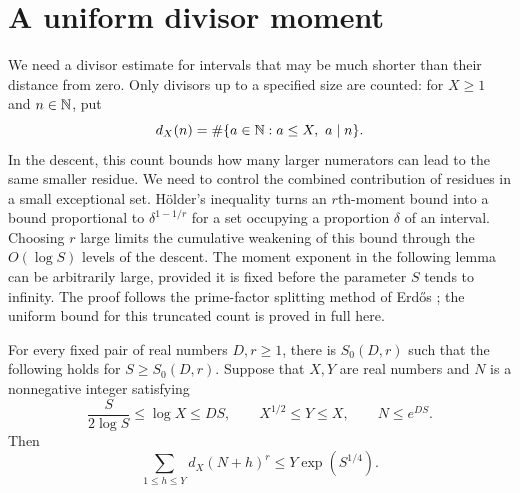 \section{A uniform divisor moment}\label{sec:divisors}

We need a divisor estimate for intervals that may be much shorter than
their distance from zero. Only divisors up to a specified size are counted:
for \(X\ge1\) and \(n\in\mathbb N\), put
\[
 d_X(n)=\#\{a\in\mathbb N:a\le X,\ a\mid n\}.
\]
In the descent, this count bounds how many larger numerators can
lead to the same smaller residue. We need to control the combined
contribution of residues in a small exceptional set. H\"older's inequality
turns an \(r\)th-moment bound into a bound proportional to
\(\delta^{1-1/r}\) for a set occupying a proportion \(\delta\) of
an interval. Choosing \(r\) large limits the cumulative weakening of
this bound through the \(O(\log S)\) levels of the descent.
The moment exponent in the following lemma can be arbitrarily large,
provided it is fixed before the parameter \(S\) tends to infinity.
The proof follows the prime-factor splitting method of
Erd\H{o}s \cite[Section~3]{Erdos1952Divisors}; the uniform bound
for this truncated count is proved in full here.

\begin{lemma}\label{lem:divisor}
For every fixed pair of real numbers \(D,r\ge1\), there is
\(S_0(D,r)\) such that the following holds for \(S\ge S_0(D,r)\).
Suppose that \(X,Y\) are real numbers and \(N\) is a nonnegative integer
satisfying
\[
 \frac{S}{2\log S}\le \log X\le DS,\qquad
 X^{1/2}\le Y\le X,\qquad N\le e^{DS}.
\]
Then
\begin{equation}\label{eq:divisor-moment}
 \sum_{1\le h\le Y}d_X(N+h)^r\le Y\exp(S^{1/4}).
\end{equation}
\end{lemma}

